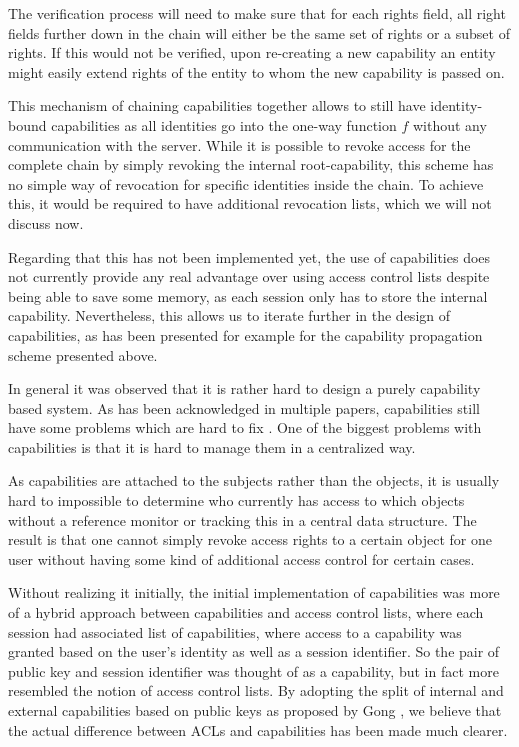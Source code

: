 The verification process will need to make sure that for each rights field, all right fields further down in the chain will either be the same set of rights or a subset of rights.
If this would not be verified, upon re-creating a new capability an entity might easily extend rights of the entity to whom the new capability is passed on.

This mechanism of chaining capabilities together allows to still have identity-bound capabilities as all identities go into the one-way function $f$ without any communication with the server.
While it is possible to revoke access for the complete chain by simply revoking the internal root-capability, this scheme has no simple way of revocation for specific identities inside the chain.
To achieve this, it would be required to have additional revocation lists, which we will not discuss now.

Regarding that this has not been implemented yet, the use of capabilities does not currently provide any real advantage over using access control lists despite being able to save some memory, as each session only has to store the internal capability.
Nevertheless, this allows us to iterate further in the design of capabilities, as has been presented for example for the capability propagation scheme presented above.

\bigskip

In general it was observed that it is rather hard to design a purely capability based system.
As has been acknowledged in multiple papers, capabilities still have some problems which are hard to fix \cite{gong1989secure,shapiro1999eros}.
One of the biggest problems with capabilities is that it is hard to manage them in a centralized way.

As capabilities are attached to the subjects rather than the objects, it is usually hard to impossible to determine who currently has access to which objects without a reference monitor or tracking this in a central data structure.
The result is that one cannot simply revoke access rights to a certain object for one user without having some kind of additional access control for certain cases.

Without realizing it initially, the initial implementation of capabilities was more of a hybrid approach between capabilities and access control lists, where each session had associated list of capabilities, where access to a capability was granted based on the user's identity as well as a session identifier.
So the pair of public key and session identifier was thought of as a capability, but in fact more resembled the notion of access control lists.
By adopting the split of internal and external capabilities based on public keys as proposed by Gong \cite{gong1989secure}, we believe that the actual difference between ACLs and capabilities has been made much clearer.

